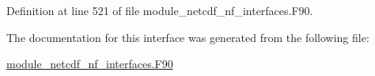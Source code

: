 Definition at line 521 of file module\+\_\+netcdf\+\_\+nf\+\_\+interfaces.\+F90.



The documentation for this interface was generated from the following file\+:\begin{DoxyCompactItemize}
\item 
\hyperlink{module__netcdf__nf__interfaces_8F90}{module\+\_\+netcdf\+\_\+nf\+\_\+interfaces.\+F90}\end{DoxyCompactItemize}

